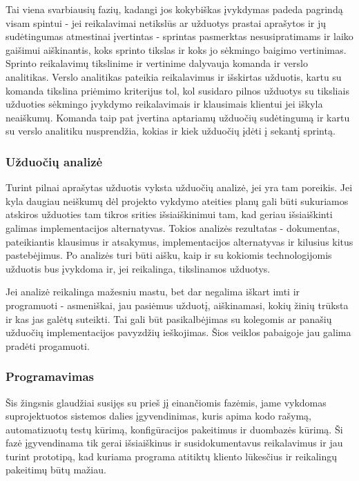 \documentclass{VUMIFPSkursinis}
\begin{document}
	Tai viena svarbiausių fazių, kadangi jos kokybiškas įvykdymas padeda pagrindą visam spintui -  jei reikalavimai netikslūs ar užduotys prastai aprašytos ir jų sudėtingumas atmestinai įvertintas - sprintas pasmerktas nesusipratimams ir laiko gaišimui aiškinantis, koks sprinto tikslas ir koks jo sėkmingo baigimo vertinimas. Sprinto reikalavimų tikslinime ir vertinime dalyvauja komanda ir verslo analitikas. Verslo analitikas pateikia reikalavimus ir išskirtas užduotis, kartu su komanda tikslina priėmimo kriterijus tol, kol susidaro pilnos užduotys su tiksliais užduoties sėkmingo įvykdymo reikalavimais ir klausimais klientui jei iškyla neaiškumų. Komanda taip pat įvertina aptariamų užduočių sudėtingumą ir kartu su verslo analitiku nusprendžia, kokias ir kiek užduočių įdėti į sekantį sprintą.
	\subsubsection{Užduočių analizė}
	Turint pilnai aprašytas užduotis vyksta užduočių analizė, jei yra tam poreikis. Jei kyla daugiau neiškumų dėl projekto vykdymo ateities planų gali būti sukuriamos atskiros užduoties tam tikros srities išsiaiškinimui tam, kad geriau išsiaiškinti galimas implementacijos alternatyvas. Tokios analizės rezultatas - dokumentas, pateikiantis klausimus ir atsakymus, implementacijos alternatyvas ir kilusius kitus pastebėjimus. Po analizės turi būti aišku, kaip ir su kokiomis technologijomis užduotis bus įvykdoma ir, jei reikalinga, tikslinamos užduotys. 
	\par Jei analizė reikalinga mažesniu mastu, bet dar negalima iškart imti ir programuoti - asmeniškai, jau pasiėmus užduotį, aiškinamasi, kokių žinių trūksta ir kas jas galėtų suteikti. Tai gali būt pasikalbėjimas su kolegomis ar panašių užduočių implementacijos pavyzdžių ieškojimas. Šios veiklos pabaigoje jau galima pradėti progamuoti.
	\subsubsection{Programavimas}
	Šis žingsnis glaudžiai susijęs su prieš jį einančiomis fazėmis, jame vykdomas suprojektuotos sistemos dalies įgyvendinimas, kuris apima kodo rašymą, automatizuotų testų kūrimą, konfigūracijos pakeitimus ir duombazės kūrimą. Ši fazė įgyvendinama tik gerai išsiaiškinus ir susidokumentavus reikalavimus ir jau turint prototipą, kad kuriama programa atitiktų kliento lūkesčius ir reikalingų pakeitimų būtų mažiau.
\end{document}

